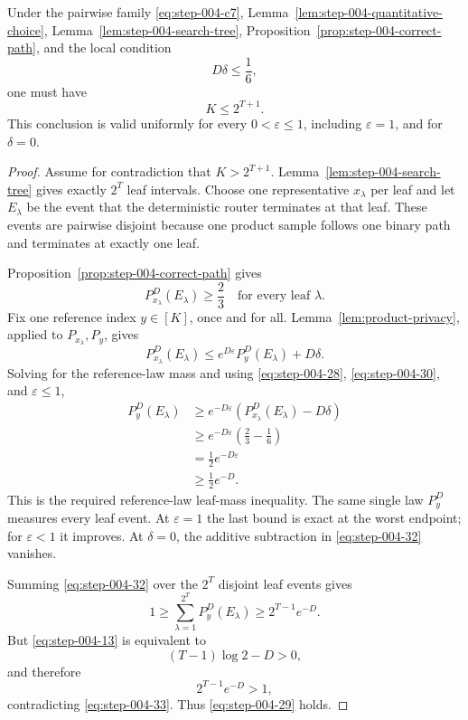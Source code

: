 \begin{proposition}
\label{prop:step-004-leaf-contradiction}

Under the pairwise family \eqref{eq:step-004-c7}, Lemma~\ref{lem:step-004-quantitative-choice}, Lemma~\ref{lem:step-004-search-tree}, Proposition~\ref{prop:step-004-correct-path}, and the local condition
\[
D\delta\le\frac16,
\tag{28}\label{eq:step-004-28}
\]
one must have
\[
K\le2^{T+1}.
\tag{29}\label{eq:step-004-29}
\]
This conclusion is valid uniformly for every \(0<\varepsilon\le 1\), including \(\varepsilon=1\), and for \(\delta=0\).

\end{proposition}

\begin{proof}

Assume for contradiction that \(K>2^{T+1}\). Lemma~\ref{lem:step-004-search-tree} gives exactly \(2^T\) leaf intervals. Choose one representative \(x_\lambda\) per leaf and let \(E_\lambda\) be the event that the deterministic router terminates at that leaf. These events are pairwise disjoint because one product sample follows one binary path and terminates at exactly one leaf.

Proposition~\ref{prop:step-004-correct-path} gives
\[
P_{x_\lambda}^D(E_\lambda)\ge\frac23
\quad\text{for every leaf }\lambda.
\tag{30}\label{eq:step-004-30}
\]
Fix one reference index \(y \in [K]\), once and for all. Lemma~\ref{lem:product-privacy}, applied to \(P_{x_\lambda},P_y\), gives
\[
P_{x_\lambda}^D(E_\lambda)
\le e^{D\varepsilon}P_y^D(E_\lambda)+D\delta.
\tag{31}\label{eq:step-004-31}
\]
Solving for the reference-law mass and using \eqref{eq:step-004-28}, \eqref{eq:step-004-30}, and \(\varepsilon\le 1\),
\[
\begin{aligned}
P_y^D(E_\lambda)
&\ge e^{-D\varepsilon}
\left(P_{x_\lambda}^D(E_\lambda)-D\delta\right)\\
&\ge e^{-D\varepsilon}\left(\frac23-\frac16\right)\\
&=\frac12e^{-D\varepsilon}\\
&\ge\frac12e^{-D}.
\end{aligned}
\tag{32}\label{eq:step-004-32}
\]
This is the required reference-law leaf-mass inequality. The same single law \(P_y^D\) measures every leaf event. At \(\varepsilon=1\) the last bound is exact at the worst endpoint; for \(\varepsilon<1\) it improves. At \(\delta=0\), the additive subtraction in \eqref{eq:step-004-32} vanishes.

Summing \eqref{eq:step-004-32} over the \(2^T\) disjoint leaf events gives
\[
1
\ge\sum_{\lambda=1}^{2^T}P_y^D(E_\lambda)
\ge2^{T-1}e^{-D}.
\tag{33}\label{eq:step-004-33}
\]
But \eqref{eq:step-004-13} is equivalent to
\[
(T-1)\log2-D>0,
\]
and therefore
\[
2^{T-1}e^{-D}>1,
\tag{34}\label{eq:step-004-34}
\]
contradicting \eqref{eq:step-004-33}. Thus \eqref{eq:step-004-29} holds.

\end{proof}


